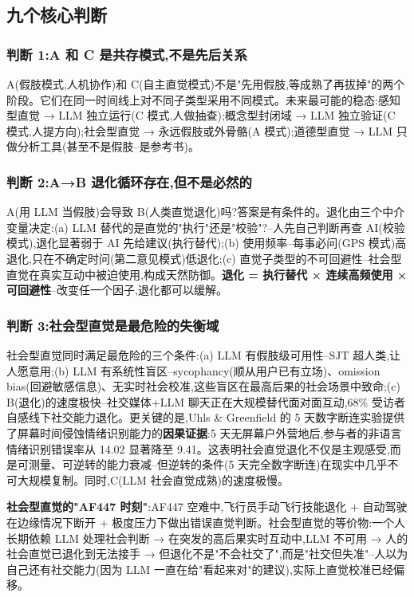 \documentclass[11pt,a4paper]{article}
\begin{document}
\subsection{九个核心判断}

\subsubsection{判断 1:A 和 C 是共存模式,不是先后关系}

A(假肢模式,人机协作)和 C(自主直觉模式)不是"先用假肢,等成熟了再拔掉"的两个阶段。它们在同一时间线上对不同子类型采用不同模式。未来最可能的稳态:感知型直觉 → LLM 独立运行(C 模式,人做抽查);概念型封闭域 → LLM 独立验证(C 模式,人提方向);社会型直觉 → 永远假肢或外骨骼(A 模式);道德型直觉 → LLM 只做分析工具(甚至不是假肢--是参考书)。

\subsubsection{判断 2:A→B 退化循环存在,但不是必然的}

A(用 LLM 当假肢)会导致 B(人类直觉退化)吗?答案是有条件的。退化由三个中介变量决定:(a) LLM 替代的是直觉的"执行"还是"校验"?--人先自己判断再查 AI(校验模式),退化显著弱于 AI 先给建议(执行替代);(b) 使用频率--每事必问(GPS 模式)高退化,只在不确定时问(第二意见模式)低退化;(c) 直觉子类型的不可回避性--社会型直觉在真实互动中被迫使用,构成天然防御。\textbf{退化 = 执行替代 × 连续高频使用 × 可回避性}--改变任一个因子,退化都可以缓解。

\subsubsection{判断 3:社会型直觉是最危险的失衡域}

社会型直觉同时满足最危险的三个条件:(a) LLM 有假肢级可用性--SJT 超人类,让人愿意用;(b) LLM 有系统性盲区--sycophancy(顺从用户已有立场)、omission bias(回避敏感信息)、无实时社会校准,这些盲区在最高后果的社会场景中致命;(c) B(退化)的速度极快--社交媒体+LLM 聊天正在大规模替代面对面互动,68\% 受访者自感线下社交能力退化\cite{zhongjing2024}。更关键的是,Uhls \& Greenfield 的 5 天数字断连实验提供了屏幕时间侵蚀情绪识别能力的\textbf{因果证据}:5 天无屏幕户外营地后,参与者的非语言情绪识别错误率从 14.02 显著降至 9.41\cite{uhls2014five}。这表明社会直觉退化不仅是主观感受,而是可测量、可逆转的能力衰减--但逆转的条件(5 天完全数字断连)在现实中几乎不可大规模复制。同时,C(LLM 社会直觉成熟)的速度极慢。

\textbf{社会型直觉的"AF447 时刻"}:AF447 空难中,飞行员手动飞行技能退化 + 自动驾驶在边缘情况下断开 + 极度压力下做出错误直觉判断\cite{bainbridge1983ironies}。社会型直觉的等价物:一个人长期依赖 LLM 处理社会判断 → 在突发的高后果实时互动中,LLM 不可用 → 人的社会直觉已退化到无法接手 → 但退化不是"不会社交了",而是"社交但失准"--人以为自己还有社交能力(因为 LLM 一直在给"看起来对"的建议),实际上直觉校准已经偏移。
\end{document}
